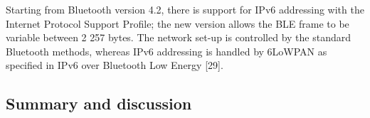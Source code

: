 Starting from Bluetooth version 4.2,
	there is support for IPv6 addressing with the Internet Protocol Support Profile;
	the new version allows the BLE frame to be variable between 2 257 bytes.
The network set-up is controlled by the standard Bluetooth methods,
	whereas IPv6 addressing is handled by 6LoWPAN as specified in IPv6 over Bluetooth Low Energy [29].




\subsection{Summary and discussion}



